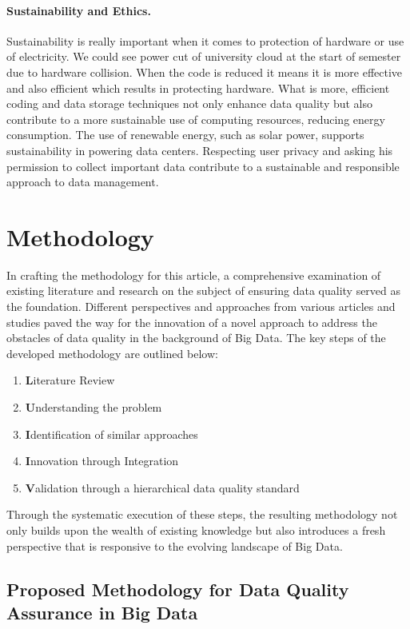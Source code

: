 \documentclass[10pt,a4paper]{article}
\begin{document}
\paragraph{Sustainability and Ethics.}
Sustainability is really important when it comes to protection of hardware or use of electricity. We could see power cut of university cloud at the start of semester due to hardware collision. When the code is reduced it means it is more effective and also efficient which results in protecting hardware. What is more, efficient coding and data storage techniques not only enhance data quality but also contribute to a more sustainable use of computing resources, reducing energy consumption. The use of renewable energy, such as solar power, supports sustainability in powering data centers. Respecting user privacy and asking his permission to collect important data contribute to a sustainable and responsible approach to data management.


\section{Methodology}
In crafting the methodology for this article, a comprehensive examination of existing literature and research on the subject of ensuring data quality served as the foundation. Different perspectives and approaches from various articles and studies paved the way for the innovation of a novel approach to address the obstacles of data quality in the background of Big Data.\cite{ji2020quality} The key steps of the developed methodology are outlined below:

\begin{enumerate}
    \item \textbf Literature Review
    \item \textbf Understanding the problem
    \item \textbf Identification of similar approaches
    \item \textbf Innovation through Integration
    \item \textbf Validation through a hierarchical data quality standard
\end{enumerate}

Through the systematic execution of these steps, the resulting methodology not only builds upon the wealth of existing knowledge but also introduces a fresh perspective that is responsive to the evolving landscape of Big Data.
 

\subsection{Proposed Methodology for Data Quality Assurance in Big Data}
\end{document}
